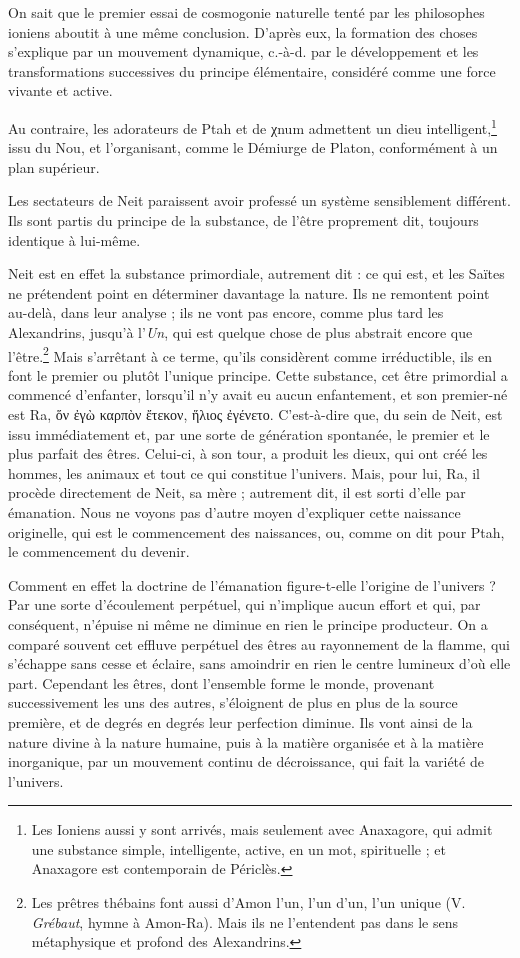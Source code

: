 \documentclass[a4paper, 11pt, oneside]{article}
\begin{document}
On sait que le premier essai de cosmogonie naturelle tenté par les philosophes ioniens aboutit à une même conclusion. D'après eux, la formation des choses s'explique par un mouvement dynamique, c.-à-d. par le développement et les transformations successives du principe élémentaire, considéré comme une force vivante et active.

Au contraire, les adorateurs de Ptah et de χnum admettent un dieu intelligent,\footnote{Les Ioniens aussi y sont arrivés, mais seulement avec Anaxagore, qui admit une substance simple, intelligente, active, en un mot, spirituelle ; et Anaxagore est contemporain de Périclès.} issu du Nou, et l'organisant, comme le Démiurge de Platon, conformément à un plan supérieur.

Les sectateurs de Neit paraissent avoir professé un système sensiblement différent. Ils sont partis du principe de la substance, de l'être proprement dit, toujours identique à lui-même.

Neit est en effet la substance primordiale, autrement dit : ce qui est, et les Saïtes ne prétendent point en déterminer davantage la nature. Ils ne remontent point au-delà, dans leur analyse ; ils ne vont pas encore, comme plus tard les Alexandrins, jusqu'à l'\emph{Un}, qui est quelque chose de plus abstrait encore que l'être.\footnote{Les prêtres thébains font aussi d'Amon l'un, l'un d’un, l'un unique (V. \emph{Grébaut}, hymne à Amon-Ra). Mais ils ne l'entendent pas dans le sens métaphysique et profond des Alexandrins.} Mais s'arrêtant à ce terme, qu'ils considèrent comme irréductible, ils en font le premier ou plutôt l'unique principe. Cette substance, cet être primordial a commencé d'enfanter, lorsqu'il n'y avait eu aucun enfantement, et son premier-né est Ra, ὅν ἐγὼ καρπὸν ἔτεκον, ἥλιος ἐγένετο. C'est-à-dire que, du sein de Neit, est issu immédiatement et, par une sorte de génération spontanée, le premier et le plus parfait des êtres. Celui-ci, à son tour, a produit les dieux, qui ont créé les hommes, les animaux et tout ce qui constitue l'univers. Mais, pour lui, Ra, il procède directement de Neit, sa mère ; autrement dit, il est sorti d'elle par émanation. Nous ne voyons pas d'autre moyen d'expliquer cette naissance originelle, qui est le commencement des naissances, ou, comme on dit pour Ptah, le commencement du devenir.

Comment en effet la doctrine de l'émanation figure-t-elle l'origine de l'univers ? Par une sorte d'écoulement perpétuel, qui n'implique aucun effort et qui, par conséquent, n'épuise ni même ne diminue en rien le principe producteur. On a comparé souvent cet effluve perpétuel des êtres au rayonnement de la flamme, qui s'échappe sans cesse et éclaire, sans amoindrir en rien le centre lumineux d'où elle part. Cependant les êtres, dont l'ensemble forme le monde, provenant successivement les uns des autres, s'éloignent de plus en plus de la source première, et de degrés en degrés leur perfection diminue. Ils vont ainsi de la nature divine à la nature humaine, puis à la matière organisée et à la matière inorganique, par un mouvement continu de décroissance, qui fait la variété de l'univers.
\end{document}
